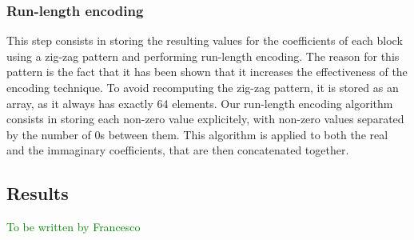 \subsubsection{Run-length encoding}
This step consists in storing the resulting values for the coefficients of each block using a zig-zag pattern and performing run-length encoding. The reason for this pattern is the fact that it has been shown that it increases the effectiveness of the encoding technique. To avoid recomputing the zig-zag pattern, it is stored as an array, as it always has exactly 64 elements. Our run-length encoding algorithm consists in storing each non-zero value explicitely, with non-zero values separated by the number of 0s between them. This algorithm is applied to both the real and the immaginary coefficients, that are then concatenated together.

\subsection{Results}
\textcolor{green}{To be written by Francesco}
